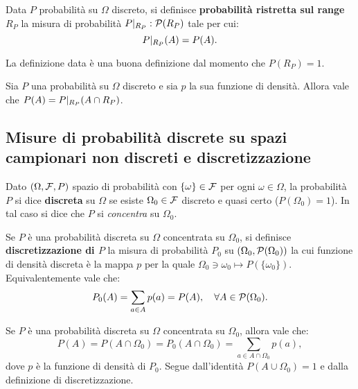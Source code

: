 \begin{multicols*}{2}
\begin{definition}
    Data $P$ probabilità su $\Omega$ discreto, si
    definisce \textbf{probabilità ristretta sul range $R_P$}
    la misura di probabilità $P\arrowvert_{R_P} : \mathcal{P}(R_P)$ tale
    per cui:
    \[
        P\arrowvert_{R_P}(A) = P(A).
    \]
\end{definition}

\begin{remark}
    La definizione data è una buona definizione dal momento che
    $P(R_P) = 1$.
\end{remark}

\begin{proposition}
    Sia $P$ una probabilità su $\Omega$ discreto e sia $p$ la
    sua funzione di densità. Allora vale che $P(A) = P\arrowvert_{R_P}(A \cap R_P)$.
\end{proposition}

\subsection{Misure di probabilità discrete su spazi campionari non discreti e discretizzazione}
\label{sec:discretizzazione}

\begin{definition}
    Dato $(\Omega, \mathcal{F}, P)$ spazio di probabilità con $\{\omega\} \in \mathcal{F}$ per
    ogni $\omega \in \Omega$, la probabilità $P$ si dice \textbf{discreta} su
    $\Omega$ se esiste $\Omega_0 \in \mathcal{F}$ discreto e quasi certo ($P(\Omega_0) = 1$).
    In tal caso si dice che $P$ si \textit{concentra} su $\Omega_0$.
\end{definition}

\begin{definition}
    Se $P$ è una probabilità discreta su $\Omega$ concentrata su $\Omega_0$,
    si definisce \textbf{discretizzazione di $P$} la misura di probabilità $P_0$
    su $(\Omega_0, \mathcal{P}(\Omega_0))$ la cui funzione di densità discreta
    è la mappa $p$ per la quale $\Omega_0 \ni \omega_0 \mapsto P(\{\omega_0\})$. Equivalentemente
    vale che:
    \[
        P_0(A) = \sum_{a \in A} p(a) = P(A), \quad \forall A \in \mathcal{P}(\Omega_0).
    \]
\end{definition}

\begin{proposition}
    Se $P$ è una probabilità discreta su $\Omega$ concentrata su $\Omega_0$, allora
    vale che:
    \[ 
        P(A) = P(A \cap \Omega_0) = P_0(A \cap \Omega_0) = \sum_{a \in A \cap \Omega_0} p(a),
    \]
    dove $p$ è la funzione di densità di $P_0$. Segue dall'identità $P(A \cup \Omega_0) = 1$ e dalla definizione di discretizzazione.
\end{proposition}


\end{multicols*}

